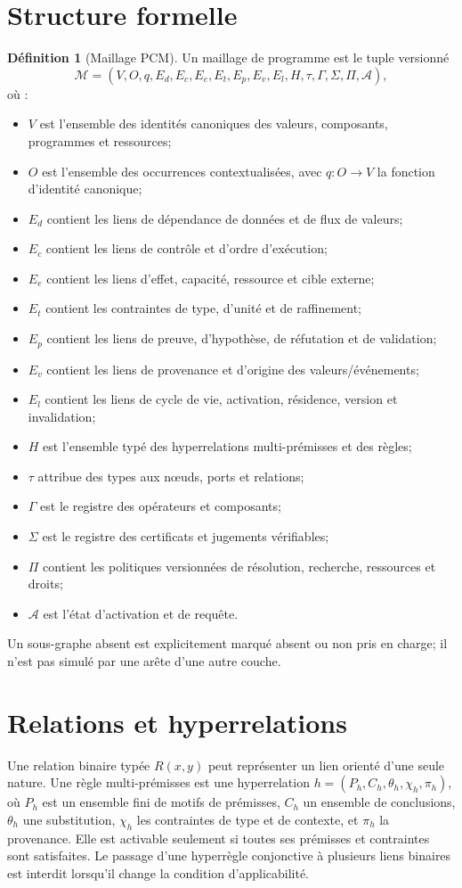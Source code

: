 \documentclass[11pt,a4paper,openany]{book}
\newcommand{\Mesh}{\mathcal{M}}
\theoremstyle{definition}
\newtheorem{definition}{Définition}[chapter]
\theoremstyle{plain}
\theoremstyle{remark}
\begin{document}
\section{Structure formelle}
\begin{definition}[Maillage PCM]
Un maillage de programme est le tuple versionné
\[
\Mesh=(V,O,q,E_d,E_c,E_e,E_t,E_p,E_v,E_l,H,\tau,\Gamma,\Sigma,\Pi,\mathcal A),
\]
où :
\begin{itemize}
\item $V$ est l'ensemble des identités canoniques des valeurs, composants, programmes et ressources;
\item $O$ est l'ensemble des occurrences contextualisées, avec $q:O\to V$ la fonction d'identité canonique;
\item $E_d$ contient les liens de dépendance de données et de flux de valeurs;
\item $E_c$ contient les liens de contrôle et d'ordre d'exécution;
\item $E_e$ contient les liens d'effet, capacité, ressource et cible externe;
\item $E_t$ contient les contraintes de type, d'unité et de raffinement;
\item $E_p$ contient les liens de preuve, d'hypothèse, de réfutation et de validation;
\item $E_v$ contient les liens de provenance et d'origine des valeurs/événements;
\item $E_l$ contient les liens de cycle de vie, activation, résidence, version et invalidation;
\item $H$ est l'ensemble typé des hyperrelations multi-prémisses et des règles;
\item $\tau$ attribue des types aux nœuds, ports et relations;
\item $\Gamma$ est le registre des opérateurs et composants;
\item $\Sigma$ est le registre des certificats et jugements vérifiables;
\item $\Pi$ contient les politiques versionnées de résolution, recherche, ressources et droits;
\item $\mathcal A$ est l'état d'activation et de requête.
\end{itemize}
Un sous-graphe absent est explicitement marqué absent ou non pris en charge; il n'est pas simulé par une arête d'une autre couche.
\end{definition}

\section{Relations et hyperrelations}
Une relation binaire typée $R(x,y)$ peut représenter un lien orienté d'une seule nature. Une règle multi-prémisses est une hyperrelation $h=(P_h,C_h,\theta_h,\chi_h,\pi_h)$, où $P_h$ est un ensemble fini de motifs de prémisses, $C_h$ un ensemble de conclusions, $\theta_h$ une substitution, $\chi_h$ les contraintes de type et de contexte, et $\pi_h$ la provenance. Elle est activable seulement si toutes ses prémisses et contraintes sont satisfaites. Le passage d'une hyperrègle conjonctive à plusieurs liens binaires est interdit lorsqu'il change la condition d'applicabilité.
\end{document}
